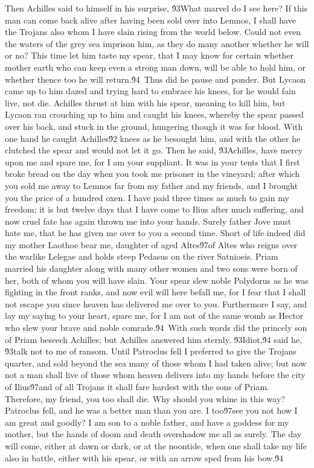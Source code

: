 {Then Achilles said to himself in his surprise, \'93What marvel do I see here? If this man can come back alive after having been sold over into Lemnos, I shall have the Trojans also whom I have slain rising from the world below. Could not even the waters of the grey sea imprison him, as they do many another whether he will or no? This time let him taste my spear, that I may know for certain whether mother earth who can keep even a strong man down, will be able to hold him, or whether thence too he will return.\'94\
Thus did he pause and ponder. But Lycaon came up to him dazed and trying hard to embrace his knees, for he would fain live, not die. Achilles thrust at him with his spear, meaning to kill him, but Lycaon ran crouching up to him and caught his knees, whereby the spear passed over his back, and stuck in the ground, hungering though it was for blood. With one hand he caught Achilles\'92 knees as he besought him, and with the other he clutched the spear and would not let it go. Then he said, \'93Achilles, have mercy upon me and spare me, for I am your suppliant. It was in your tents that I first broke bread on the day when you took me prisoner in the vineyard; after which you sold me away to Lemnos far from my father and my friends, and I brought you the price of a hundred oxen. I have paid three times as much to gain my freedom; it is but twelve days that I have come to Ilius after much suffering, and now cruel fate has again thrown me into your hands. Surely father Jove must hate me, that he has given me over to you a second time. Short of life indeed did my mother Laothoe bear me, daughter of aged Altes\'97of Altes who reigns over the warlike Lelegae and holds steep Pedasus on the river Satnioeis. Priam married his daughter along with many other women and two sons were born of her, both of whom you will have slain. Your spear slew noble Polydorus as he was fighting in the front ranks, and now evil will here befall me, for I fear that I shall not escape you since heaven has delivered me over to you. Furthermore I say, and lay my saying to your heart, spare me, for I am not of the same womb as Hector who slew your brave and noble comrade.\'94\
With such words did the princely son of Priam beseech Achilles; but Achilles answered him sternly. \'93Idiot,\'94 said he, \'93talk not to me of ransom. Until Patroclus fell I preferred to give the Trojans quarter, and sold beyond the sea many of those whom I had taken alive; but now not a man shall live of those whom heaven delivers into my hands before the city of Ilius\'97and of all Trojans it shall fare hardest with the sons of Priam. Therefore, my friend, you too shall die. Why should you whine in this way? Patroclus fell, and he was a better man than you are. I too\'97see you not how I am great and goodly? I am son to a noble father, and have a goddess for my mother, but the hands of doom and death overshadow me all as surely. The day will come, either at dawn or dark, or at the noontide, when one shall take my life also in battle, either with his spear, or with an arrow sped from his bow.\'94\
}
